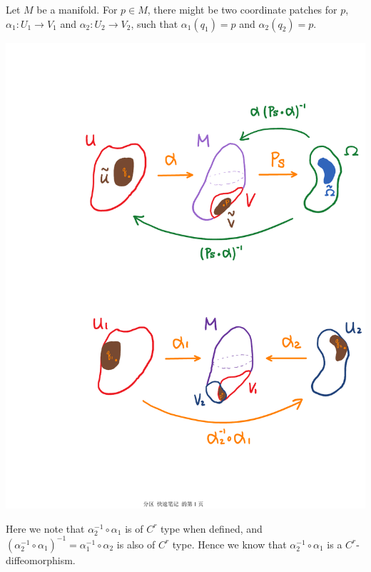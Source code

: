 \documentclass[15pt]{book}
\theoremstyle{break}
\theoremstyle{break}
\begin{document}
\hfill\break
\hfill\break
Let $M$ be a manifold. For $p\in M$, there might be two coordinate patches for $p$, $\alpha_1:U_1\to V_1$ and $\alpha_2:U_2\to V_2$, such that $\alpha_1(q_1) = p$ and $\alpha_2(q_2) = p$. 
\begin{center}
\includegraphics[scale=0.69]{coorPatch.pdf}
\end{center}
Here we note that $\alpha_2^{-1}\circ \alpha_1$ is of $C^r$ type when defined, and $(\alpha_2^{-1}\circ \alpha_1)^{-1} = \alpha_1^{-1} \circ \alpha_2$ is also of $C^r$ type. Hence we know that $\alpha_2^{-1}\circ \alpha_1$ is a $C^r$-diffeomorphism. \\
\newpage
\end{document}
